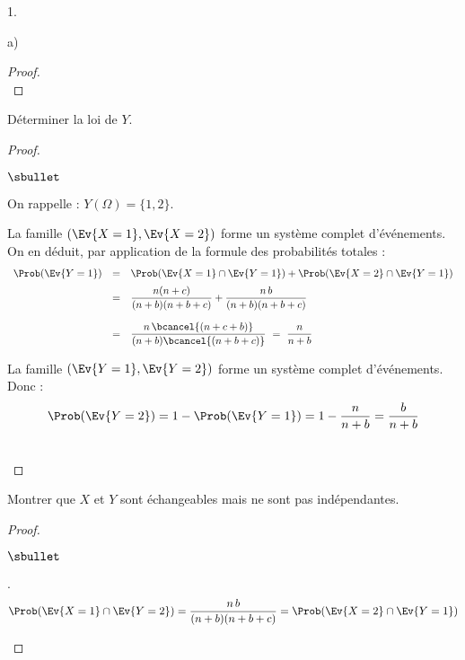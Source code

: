 \documentclass[11pt]{article}%
\begin{document}
\begin{noliste}{1.}
\begin{noliste}{a)}
\begin{proof}
 ~\\[-1.4cm]
\end{proof}


\item Déterminer la loi de $Y$.

\begin{proof}~
 \begin{noliste}{$\sbullet$}
  \item On rappelle : $Y(\Omega)=\{1,2\}$.
  
  \item La famille $(\Ev{X=1},\Ev{X=2})$ forme un système complet
    d'événements.\\
    On en déduit, par application de la formule des probabilités
    totales :
    \[
    \begin{array}{rcl}
      \Prob(\Ev{Y=1}) & = & \Prob(\Ev{X=1} \cap \Ev{Y=1}) + 
      \Prob(\Ev{X=2}\cap \Ev{Y=1})
      \\[.2cm]
      & = & \dfrac{n(n+c)}{(n+b)(n+b+c)} + \dfrac{n \, b}{(n+b)(n+b+c)}
      \\[.6cm]
      & = & \dfrac{n\, \bcancel{(n+c+b)}}{(n+b)\bcancel{(n+b+c)}}
      \ = \ \dfrac{n}{n+b}
    \end{array}
    \]
  
  \item La famille $(\Ev{Y=1},\Ev{Y=2})$ forme un système complet 
  d'événements. Donc :
  \[
   \Prob(\Ev{Y=2}) = 1-\Prob(\Ev{Y=1}) = 1-\dfrac{n}{n+b} = 
   \dfrac{b}{n+b}
  \]
 \end{noliste}
 
 
 
 
 
 ~\\[-1.4cm]
\end{proof}


\item Montrer que $X$ et $Y$ sont échangeables mais ne sont pas 
indépendantes.

\begin{proof}~
 \begin{noliste}{$\sbullet$}
  \item {}.
  \[
   \Prob(\Ev{X=1}\cap \Ev{Y=2}) = \dfrac{n \, b}{(n+b)(n+b+c)} =
   \Prob(\Ev{X=2}\cap \Ev{Y=1})
  \]
  

\end{noliste}
\end{proof}
\end{noliste}
\end{noliste}
\end{document}
